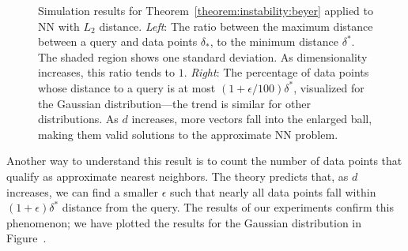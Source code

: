 \begin{figure}[t]
    \centering
    \hspace*{-1.5em}
    \caption{Simulation results for Theorem~\ref{theorem:instability:beyer} applied to NN with $L_2$ distance.
    \emph{Left}: The ratio between the maximum
    distance between a query and data points $\delta_\ast$, to the minimum distance $\delta^\ast$.
    The shaded region shows one standard deviation.
    As dimensionality increases, this ratio tends to $1$. \emph{Right}: The percentage of data points whose
    distance to a query is at most $(1 + \epsilon/100) \delta^\ast$, visualized for the Gaussian
    distribution---the trend is similar for other distributions. As $d$ increases, more vectors
    fall into the enlarged ball, making them valid solutions to the approximate NN problem.}
    \label{figure:instability:instability}
\end{figure}

Another way to understand this result is to count the number of data points that qualify
as approximate nearest neighbors. The theory predicts that, as $d$ increases, we can find a smaller
$\epsilon$ such that nearly all data points fall within $(1 + \epsilon) \delta^\ast$ distance from the query.
The results of our experiments confirm this phenomenon; we have plotted the results for the Gaussian distribution
in Figure~.


